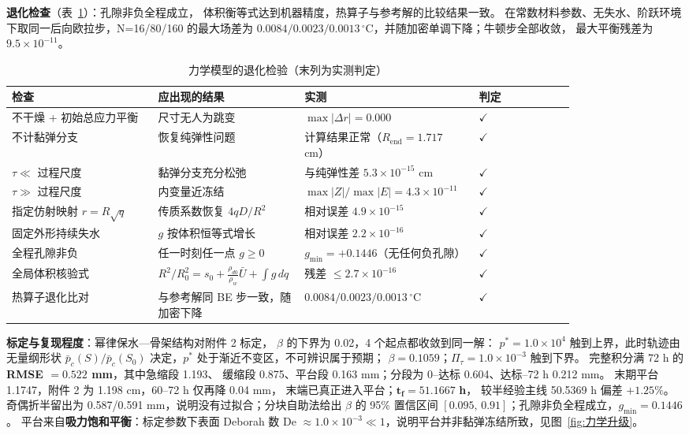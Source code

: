\documentclass[12pt,a4paper]{ctexart}
\numberwithin{equation}{section}
\begin{document}
\textbf{退化检查}（表~\ref{tab:力学退化}）：孔隙非负全程成立，
体积衡等式达到机器精度，热算子与参考解的比较结果一致。
在常数材料参数、无失水、阶跃环境下取同一后向欧拉步，N=16/80/160 的最大场差为
$0.0084/0.0023/0.0013\,^{\circ}$C，并随加密单调下降；牛顿步全部收敛，
最大平衡残差为 $9.5\times10^{-11}$。

\begin{table}[htbp]
\centering
\caption{力学模型的退化检验（末列为实测判定）}
\label{tab:力学退化}
\small
\begin{tabular}{p{0.26\linewidth}p{0.26\linewidth}p{0.31\linewidth}l}
\toprule
检查 & 应出现的结果 & 实测 & 判定 \\
\midrule
不干燥 + 初始总应力平衡 & 尺寸无人为跳变 & $\max|\Delta r|=0.000$ & $\checkmark$ \\
不计黏弹分支 & 恢复纯弹性问题 & 计算结果正常（$R_{\mathrm{end}}=1.717$ cm） & $\checkmark$ \\
$\tau\ll$ 过程尺度 & 黏弹分支充分松弛 & 与纯弹性差 $5.3\times10^{-15}$ cm & $\checkmark$ \\
$\tau\gg$ 过程尺度 & 内变量近冻结 & $\max|Z|/\max|E|=4.3\times10^{-11}$ & $\checkmark$ \\
指定仿射映射 $r=R\sqrt q$ & 传质系数恢复 $4qD/R^2$ & 相对误差 $4.9\times10^{-15}$ & $\checkmark$ \\
固定外形持续失水 & $g$ 按体积恒等式增长 & 相对误差 $2.2\times10^{-16}$ & $\checkmark$ \\
全程孔隙非负 & 任一时刻任一点 $g\ge0$ & $g_{\min}=+0.1446$（无任何负孔隙） & $\checkmark$ \\
全局体积核验式 & $R^2/R_0^2=s_0+\frac{\rho_{d0}}{\rho_w}\bar U+\int g\,dq$ & 残差 $\le2.7\times10^{-16}$ & $\checkmark$ \\
热算子退化比对 & 与参考解同 BE 步一致，随加密下降 & $0.0084/0.0023/0.0013\,^{\circ}$C & $\checkmark$ \\
\bottomrule
\end{tabular}
\end{table}

\textbf{标定与复现程度}：幂律保水—骨架结构对附件 2 标定，
$\beta$ 的下界为 0.02，4 个起点都收敛到同一解：
$p^*=1.0\times10^{4}$ 触到上界，此时轨迹由无量纲形状
$\bar p_c(S)/\bar p_c(S_0)$ 决定，$p^*$ 处于渐近不变区，不可辨识属于预期；
$\beta=0.1059$；$\Pi_\tau=1.0\times10^{-3}$ 触到下界。
完整积分满 72 h 的 \textbf{RMSE $=0.522$ mm}，其中急缩段 1.193、
缓缩段 0.875、平台段 0.163 mm；分段为 0--达标 0.604、达标--72 h 0.212 mm。
末期平台 1.1747，附件 2 为 1.198 cm，60--72 h 仅再降 0.04 mm，
末端已真正进入平台；$\bm{t_f=51.1667}$ \textbf{h}，
较半经验主线 50.5369 h 偏差 $+1.25\%$。
奇偶折半留出为 0.587/0.591 mm，说明没有过拟合；分块自助法给出 $\beta$ 的 95\%
置信区间 $[0.095,\,0.91]$；孔隙非负全程成立，$g_{\min}=0.1446$。
平台来自\textbf{吸力饱和平衡}：标定参数下表面 Deborah 数
De $\approx1.0\times10^{-3}\ll1$，说明平台并非黏弹冻结所致，见图~\ref{fig:力学升级}。
\end{document}
